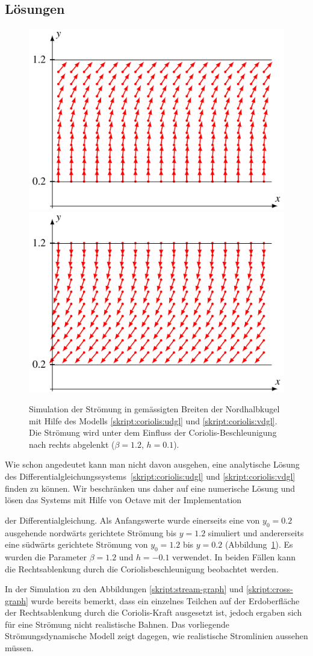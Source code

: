 \subsection{Lösungen}
\begin{figure}
\centering
\includegraphics[width=0.48\hsize]{chapters/2/upright.pdf}
\hspace{0.02\hsize}
\includegraphics[width=0.48\hsize]{chapters/2/downright.pdf}
\caption{Simulation der Strömung in gemässigten Breiten der Nordhalbkugel
mit Hilfe des Modells
\eqref{skript:coriolis:udgl}
und
\eqref{skript:coriolis:vdgl}.
Die Strömung wird unter dem Einfluss der Coriolis-Beschleunigung nach
rechts abgelenkt ($\beta=1.2$, $h=0.1$).
\label{section:coriolis:simbild}}
\end{figure}
Wie schon angedeutet kann man nicht davon ausgehen, eine analytische
Lösung des Differentialgleichungssystems~\eqref{skript:coriolis:udgl}
und \eqref{skript:coriolis:vdgl}
finden zu können.
Wir beschränken uns daher auf eine numerische Lösung und
lösen das Systems mit Hilfe von Octave mit der Implementation

der Differentialgleichung.
Als Anfangswerte wurde einerseits eine von $y_0=0.2$ ausgehende nordwärts
gerichtete Strömung bis $y=1.2$ simuliert und andererseits eine südwärts
gerichtete Strömung von $y_0=1.2$ bis $y=0.2$
(Abbildung~\ref{section:coriolis:simbild}).
Es wurden die Parameter $\beta=1.2$ und $h=-0.1$ verwendet.
In beiden Fällen kann die Rechtsablenkung durch die Coriolisbeschleunigung
beobachtet werden.

In der Simulation zu den Abbildungen
\ref{skript:stream-graph}
und
\ref{skript:cross-graph}
wurde bereits bemerkt, dass ein einzelnes Teilchen auf der Erdoberfläche
der Rechtsablenkung durch die Coriolis-Kraft ausgesetzt ist,
jedoch ergaben sich für eine Strömung nicht realistische Bahnen.
Das vorliegende Strömungsdynamische Modell zeigt dagegen, wie
realistische Stromlinien aussehen müssen.

